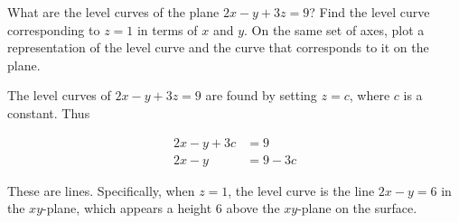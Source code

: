 \documentclass[noauthor]{ximera}
\begin{document}
\begin{problem}
What are the level curves of the plane $2x-y+3z=9$?  Find the level curve corresponding to $z=1$ in terms of $x$ and $y$.  On the same set of axes, plot a representation of the level curve and the curve that corresponds to it on the plane.

\begin{freeResponse}
The level curves of $2x-y+3z=9$ are found by setting $z=c$, where $c$ is a constant.  Thus

\begin{align*}
2x-y+3c&=9 \\
2x-y &= 9-3c
\end{align*}

These are lines.  Specifically, when $z=1$, the level curve is the line $2x-y=6$ in the $xy$-plane, which appears a height $6$ above the $xy$-plane on the surface.

\end{freeResponse}
\end{problem}

\end{document}
